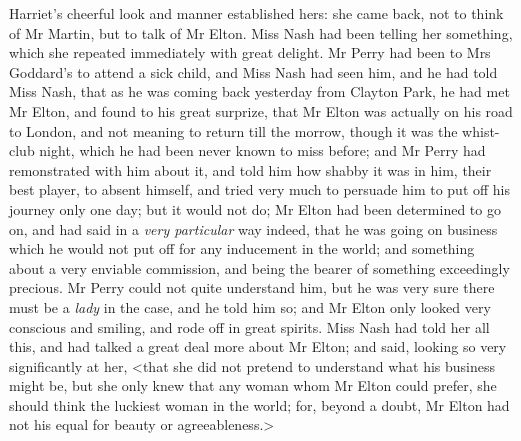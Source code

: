 Harriet's cheerful look and manner established hers: she came back, not to think of Mr Martin, but to talk of Mr Elton. Miss Nash had been telling her something, which she repeated immediately with great delight. Mr Perry had been to Mrs Goddard's to attend a sick child, and Miss Nash had seen him, and he had told Miss Nash, that as he was coming back yesterday from Clayton Park, he had met Mr Elton, and found to his great surprize, that Mr Elton was actually on his road to London, and not meaning to return till the morrow, though it was the whist-club night, which he had been never known to miss before; and Mr Perry had remonstrated with him about it, and told him how shabby it was in him, their best player, to absent himself, and tried very much to persuade him to put off his journey only one day; but it would not do; Mr Elton had been determined to go on, and had said in a \textit{very particular} way indeed, that he was going on business which he would not put off for any inducement in the world; and something about a very enviable commission, and being the bearer of something exceedingly precious. Mr Perry could not quite understand him, but he was very sure there must be a \textit{lady} in the case, and he told him so; and Mr Elton only looked very conscious and smiling, and rode off in great spirits. Miss Nash had told her all this, and had talked a great deal more about Mr Elton; and said, looking so very significantly at her, <that she did not pretend to understand what his business might be, but she only knew that any woman whom Mr Elton could prefer, she should think the luckiest woman in the world; for, beyond a doubt, Mr Elton had not his equal for beauty or agreeableness.>